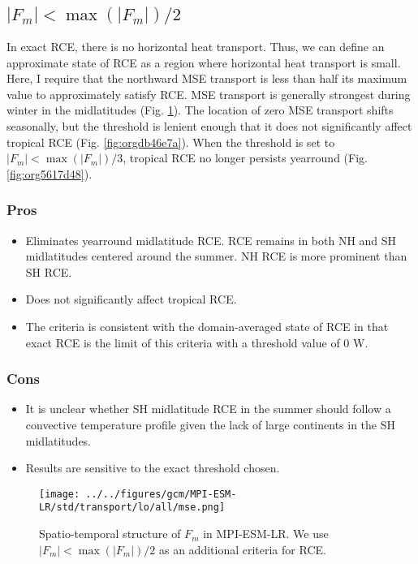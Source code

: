 \documentclass[11pt]{article}
\begin{document}
\clearpage
\subsection{\(|F_m|<\max(|F_m|)/2\)}
\label{sec:orgece31ed}
In exact RCE, there is no horizontal heat transport. Thus, we can define an approximate state of RCE as a region where horizontal heat transport is small. Here, I require that the northward MSE transport is less than half its maximum value to approximately satisfy RCE. MSE transport is generally strongest during winter in the midlatitudes (Fig. \ref{fig:org845a067}). The location of zero MSE transport shifts seasonally, but the threshold is lenient enough that it does not significantly affect tropical RCE (Fig. \ref{fig:orgdb46e7a}). When the threshold is set to \(|F_m|<\max(|F_m|)/3\), tropical RCE no longer persists yearround (Fig. \ref{fig:org5617d48}).

\subsubsection*{Pros}
\label{sec:orgbbb8d7d}
\begin{itemize}
\item Eliminates yearround midlatitude RCE. RCE remains in both NH and SH midlatitudes centered around the summer. NH RCE is more prominent than SH RCE.
\item Does not significantly affect tropical RCE.
\item The criteria is consistent with the domain-averaged state of RCE in that exact RCE is the limit of this criteria with a threshold value of 0 W.
\end{itemize}
\subsubsection*{Cons}
\label{sec:org817b123}
\begin{itemize}
\item It is unclear whether SH midlatitude RCE in the summer should follow a convective temperature profile given the lack of large continents in the SH midlatitudes.
\item Results are sensitive to the exact threshold chosen.
\end{itemize}

\clearpage

\begin{figure}[!h]
\centering
\texttt{[image: ../../figures/gcm/MPI-ESM-LR/std/transport/lo/all/mse.png]}
\caption{\label{fig:org845a067}Spatio-temporal structure of \(F_m\) in MPI-ESM-LR. We use \(|F_m|<\max(|F_m|)/2\) as an additional criteria for RCE.}
\end{figure}
\end{document}
